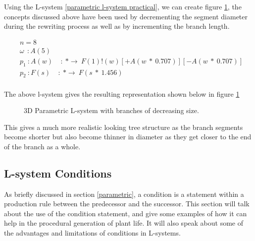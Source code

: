 Using the L-system \ref{parametric l-system practical}, we can create figure \ref{3D branching pattern}, the concepts discussed above have been used by decrementing the segment diameter during the rewriting process as well as by incrementing the branch length.

\begin{singlespace}
\begin{equation} \label{parametric l-system practical}
\begin{aligned}
	&n=8 \\
	&\omega~~ : A(5)\\
	&p_1~ :  A(w)~~~~~ :~ * \rightarrow~ F(1)!(w)[+A(w~*~0.707)][-A(w~*~0.707)]\\
	&p_2~ :  F(s)~~~~~ :~ * \rightarrow~ F(s~*~1.456)\\
\end{aligned}
\end{equation}
\end{singlespace}

\vspace{5mm} 
The above l-system gives the resulting representation shown below in figure \ref{3D branching pattern} 

\begin{figure}[htbp]
	{\centering
		\vspace{7px}
		\setlength{\fboxrule}{1pt}
		\caption{3D Parametric L-system with branches of decreasing size.} \label{3D branching pattern}
	}
\end{figure}
\FloatBarrier

\noindent
This gives a much more realistic looking tree structure as the branch segments become shorter but also become thinner in diameter as they get closer to the end of the branch as a whole. 


\subsection{L-system Conditions} \label{Condition L-system Subsection}

As briefly discussed in section \ref{parametric}, a condition is a statement within a production rule between the predecessor and the successor. This section will talk about the use of the condition statement, and give some examples of how it can help in the procedural generation of plant life. It will also speak about some of the advantages and limitations of conditions in L-systems.

